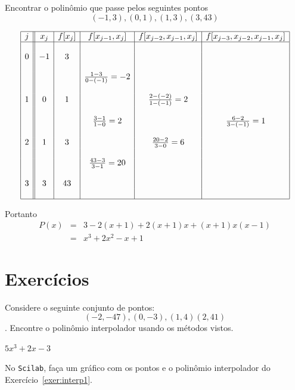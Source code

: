 \documentclass[main.tex]{subfiles}
\begin{document}
\begin{ex}
Encontrar o polinômio que passe pelos seguintes pontos
$$(-1,3),(0,1),(1,3),(3,43)$$

\begin{equation*}
\begin{array}{|c||c|c|c|c|c|}\hline
 j&x_j&f[x_j]&f[x_{j-1},x_j]&f[x_{j-2},x_{j-1},x_j]&f[x_{j-3},x_{j-2},x_{j-1},x_j]\\\hline
&&&&&\\
0& -1 & 3&&&\\
&&&&&\\
&&&\frac{1-3}{0-(-1)}=-2&&\\
&&&&&\\
1&0&1&&\frac{2-(-2)}{1-(-1)}=2&\\
&&&&&\\
&&&\frac{3-1}{1-0}=2&&\frac{6-2}{3-(-1)}=1\\
&&&&&\\
2&1&3&&\frac{20-2}{3-0}=6&\\
&&&&&\\
&&&\frac{43-3}{3-1}=20&&\\
&&&&&\\
3&3&43&&&\\
&&&&&\\\hline
\end{array}  
\end{equation*}



Portanto
\begin{eqnarray*}
P(x)&=&3-2(x+1)+2(x+1)x+(x+1)x(x-1)\\
&=&x^3+2x^2-x+1
\end{eqnarray*}
\end{ex}

\section*{Exercícios}


\begin{Exercise}\label{exer:interp1}
Considere o seguinte conjunto de pontos: $$(-2,-47),(0,-3),(1,4)(2,41)$$. Encontre o polinômio interpolador usando os métodos vistos. 
\end{Exercise}
\begin{Answer}
  \begin{tiny}
$5x^3+2x-3$    
  \end{tiny}
\end{Answer}

\ifisscilab
\begin{Exercise}
  No \verb+Scilab+, faça um gráfico com os pontos e o polinômio interpolador do Exercício~\ref{exer:interp1}.
\end{Exercise}
\fi
\end{document}
